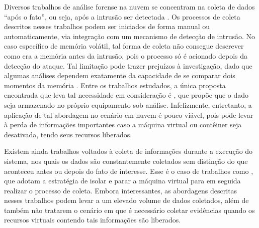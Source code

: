Diversos trabalhos de análise forense na nuvem se concentram na coleta de dados ``após o fato'', ou seja, após a intrusão ser detectada \cite{ReichertAutoAcquisition:2015,PoiselVMI:2013,DykstraFROST:2013,GeorgeDF2CE:2012,SangLogApproach:2013}. 
%
Os processos de coleta descritos nesses trabalhos podem ser iniciados de forma manual ou automaticamente, via integração com um mecanismo de detecção de intrusão. 
%
No caso específico de memória volátil, tal forma de coleta não consegue descrever como era a memória antes da intrusão, pois o processo só é acionado depois da detecção do ataque. 
%
Tal limitação pode trazer prejuízos à investigação, dado que algumas análises dependem exatamente da capacidade de se comparar dois momentos da memória \cite{CaseMemoryForensics:2014}. 
%
Entre os trabalhos estudados, a única proposta encontrada que leva tal necessidade em consideração é \cite{DezfouliBackupApproach:2012}, que propõe que o dado seja armazenado no próprio equipamento sob análise.
%
Infelizmente, entretanto, a aplicação de tal abordagem no cenário em nuvem é pouco viável, pois pode levar à perda de informações importantes caso a máquina virtual ou contêiner seja desativada, tendo seus recursos liberados.
%

Existem ainda trabalhos voltados à coleta de informações durante a execução do sistema, nos quais os dados são constantemente coletados sem distinção do que aconteceu antes ou depois do fato de interesse.
%
Esse é o caso de trabalhos como \cite{PoiselVMI:2013,DykstraFROST:2013,SangLogApproach:2013}, que adotam a estratégia de isolar e parar a máquina virtual para em seguida realizar o processo de coleta. 
%
Embora interessantes, as abordagens descritas nesses trabalhos podem levar a um elevado volume de dados coletados, além de também não tratarem o cenário em que é necessário coletar evidências quando os recursos virtuais contendo tais informações são liberados.


